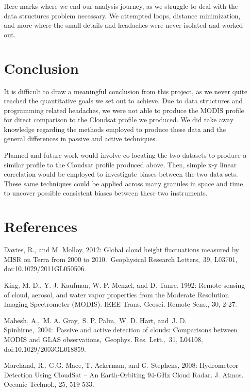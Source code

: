 \documentclass[11pt]{article}
\begin{document}
    Here marks where we end our analysis journey, as we struggle to deal
with the data structures problem necessary. We attempted loops, distance
minimization, and more where the small details and headaches were never
isolated and worked out.

    \section{Conclusion}\label{conclusion}

It is difficult to draw a meaningful conclusion from this project, as we
never quite reached the quantitative goals we set out to achieve. Due to
data structures and programming related headaches, we were not able to
produce the MODIS profile for direct comparison to the Cloudsat profile
we produced. We did take away knowledge regarding the methods employed
to produce these data and the general differences in passive and active
techniques.

Planned and future work would involve co-locating the two datasets to
produce a similar profile to the Cloudsat profile produced above. Then,
simple x-y linear correlation would be employed to investigate biases
between the two data sets. These same techniques could be applied across
many granules in space and time to uncover possible consistent biases
between these two instruments.

    \section{References}\label{references}

Davies, R., and M. Molloy, 2012: Global cloud height fluctuations
measured by MISR on Terra from 2000 to 2010.~Geophysical Research
Letters,~39, L03701, doi:10.1029/2011GL050506.

King, M. D., Y. J. Kaufman, W. P. Menzel, and D. Tanre, 1992: Remote
sensing of cloud, aerosol, and water vapor properties from the Moderate
Resolution Imaging Spectrometer (MODIS). IEEE Trans. Geosci. Remote
Sens., 30, 2-27.

Mahesh, A.,~M. A. Gray,~S. P. Palm,~W. D. Hart, and~J. D.
Spinhirne,~2004:~Passive and active detection of clouds: Comparisons
between MODIS and GLAS observations,~Geophys. Res. Lett.,~31, L04108,
doi:10.1029/2003GL018859.

Marchand, R., G.G. Mace, T. Ackerman, and G. Stephens, 2008: Hydrometeor
Detection Using CloudSat -- An Earth-Orbiting 94-GHz Cloud Radar. J.
Atmos. Oceanic Technol., 25, 519-533.
\end{document}
